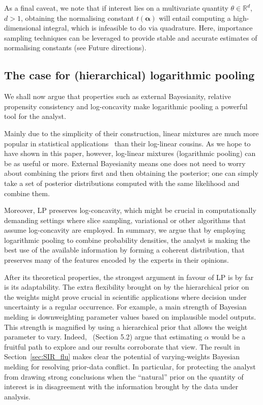 \documentclass[a4paper, notitlepage, 11pt]{article}
\begin{document}
As a final caveat, we note that if interest lies on a multivariate quantity $\theta \in \mathbb{R}^d$, $d>1$, obtaining the normalising constant $t(\boldsymbol\alpha)$ will entail computing a high-dimensional integral, which is infeasible to do via quadrature.
Here, importance sampling techniques can be leveraged to provide stable and accurate estimates of normalising constants (see Future directions). 


\subsection{The case for (hierarchical) logarithmic pooling}

We shall now argue that properties such as external Bayesianity, relative propensity consistency and log-concavity make logarithmic pooling a powerful tool for the analyst.

Mainly due to the simplicity of their construction, linear mixtures are much more popular in statistical applications~\citep{Fruhwirth2019} than their log-linear cousins.
As we hope to have shown in this paper, however, log-linear mixtures (logarithmic pooling) can be as useful or more.
External Bayesianity means one does not need to worry about combining the priors first and then obtaining the posterior; one can simply take a set of posterior distributions computed with the same likelihood and combine them.

Moreover, LP preserves log-concavity, which might be crucial in computationally demanding settings where slice sampling, variational or other algorithms that assume log-concavity are employed.
In summary, we argue that by employing logarithmic pooling to combine probability densities, the analyst is making the best use of the available information by forming a coherent distribution, that preserves many of the features encoded by the experts in their opinions.

After its theoretical properties, the strongest argument in favour of LP is by far is its adaptability.
The extra flexibility brought on by the hierarchical prior on the weights might prove crucial in scientific applications where decision under uncertainty is a regular occurrence.
For example, a main strength of Bayesian melding is downweighting parameter values based on implausible model outputs.
This strength is magnified by using a hierarchical prior that allows the weight parameter to vary.
Indeed,~\cite{Poole2000} (Section 5.2) argue that estimating $\alpha$ would be a fruitful path to explore and our results corroborate that view.
The result in Section~\ref{sec:SIR_flu} makes clear the potential of varying-weights Bayesian melding for resolving prior-data conflict.
In particular, for protecting the analyst from drawing strong conclusions when the ``natural'' prior on the quantity of interest is in disagreement with the information brought by the data under analysis.
\end{document}

